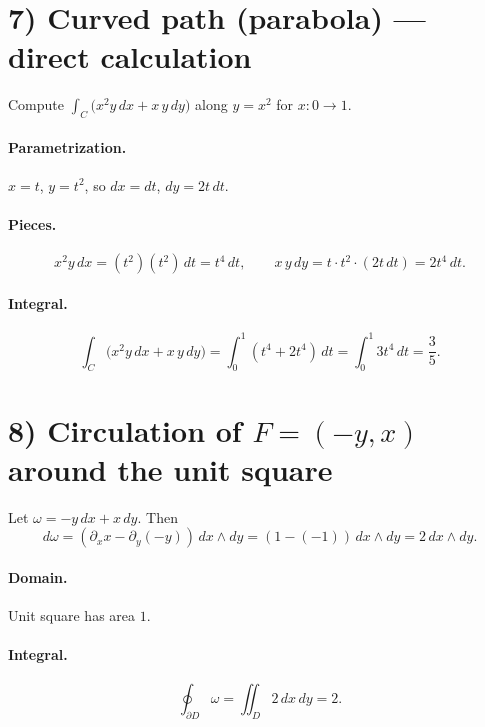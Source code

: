 \documentclass[11pt]{article}
\begin{document}
\section*{7) Curved path (parabola) --- direct calculation}
Compute $\displaystyle \int_{C}\bigl(x^{2}y\,dx+x\,y\,dy\bigr)$ along $y=x^{2}$ for $x:0\to 1$.

\paragraph{Parametrization.}
$x=t$, $y=t^{2}$, so $dx=dt$, $dy=2t\,dt$.

\paragraph{Pieces.}
\[
x^{2}y\,dx
=
(t^{2})(t^{2})\,dt
=
t^{4}\,dt,
\qquad
x\,y\,dy
=
t\cdot t^{2}\cdot (2t\,dt)
=
2t^{4}\,dt.
\]

\paragraph{Integral.}
\[
\int_{C}\bigl(x^{2}y\,dx+x\,y\,dy\bigr)
=
\int_{0}^{1} (t^{4}+2t^{4})\,dt
=
\int_{0}^{1} 3t^{4}\,dt
=
\frac{3}{5}.
\]

\bigskip

\section*{8) Circulation of $F=(-y,x)$ around the unit square}
Let $\omega=-y\,dx+x\,dy$. Then
\[
d\omega=(\partial_x x - \partial_y(-y))\,dx\wedge dy
=
(1-(-1))\,dx\wedge dy
=
2\,dx\wedge dy.
\]

\paragraph{Domain.}
Unit square has area $1$.

\paragraph{Integral.}
\[
\oint_{\partial D}\omega
=
\iint_{D} 2\,dx\,dy
=
2.
\]

\bigskip

\end{document}
